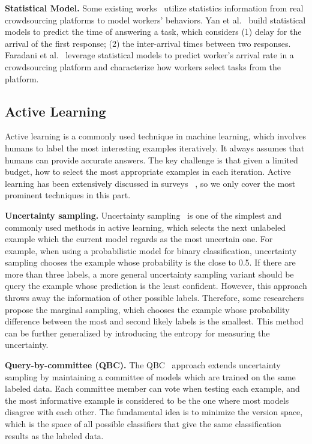 \textbf{Statistical Model.}
Some existing works~\cite{DBLP:conf/mobisys/YanKG10,DBLP:conf/aaai/FaradaniHI11} utilize statistics information from real crowdsourcing platforms to model workers’ behaviors. Yan et al.~\cite{DBLP:conf/mobisys/YanKG10} build statistical models to predict the time of answering a task, which considers (1) delay for the arrival of the first response; (2) the inter-arrival times between two responses.  Faradani et al.~\cite{DBLP:conf/aaai/FaradaniHI11} leverage statistical models to predict worker’s arrival rate in a crowdsourcing platform and characterize how workers select tasks from the platform. 



\subsection{Active Learning}\label{subsec:active_learning}
Active learning is a commonly used technique in machine learning, which involves humans to label the most interesting examples iteratively.  It always assumes that humans can provide accurate answers. The key challenge is that given a limited budget, how to select the most appropriate  examples in each iteration. Active learning has been  extensively discussed in  surveys ~\cite{settles2009active, DBLP:reference/sp/2015rsh}, so we only cover the most prominent techniques in this part. %

\textbf{Uncertainty sampling.} Uncertainty sampling~\cite{DBLP:conf/sigir/LewisG94} is one of the simplest and commonly used methods in active learning, which selects the next unlabeled example which the current model regards as the most uncertain one. For example, when using a probabilistic model for binary classification, uncertainty sampling chooses the example whose probability is the close to 0.5. If there are more than three labels, a more general uncertainty sampling variant should be  query the example whose prediction is the least confident.
However, this approach throws away the information of  other possible labels. Therefore, some researchers propose the marginal sampling, which chooses the example whose probability difference between the most and second likely labels is the smallest. This method can be further generalized by introducing the entropy for measuring the uncertainty. 

\textbf{Query-by-committee (QBC).} The QBC~\cite{DBLP:conf/colt/SeungOS92} approach extends uncertainty sampling by maintaining a committee of models which are trained on the same labeled data. Each committee member can vote when testing each example, and the most informative example is considered to be the one where  most models disagree with each other. The fundamental idea is to minimize the version space, which is the space of all possible classifiers that give the same classification results as  the labeled data.


